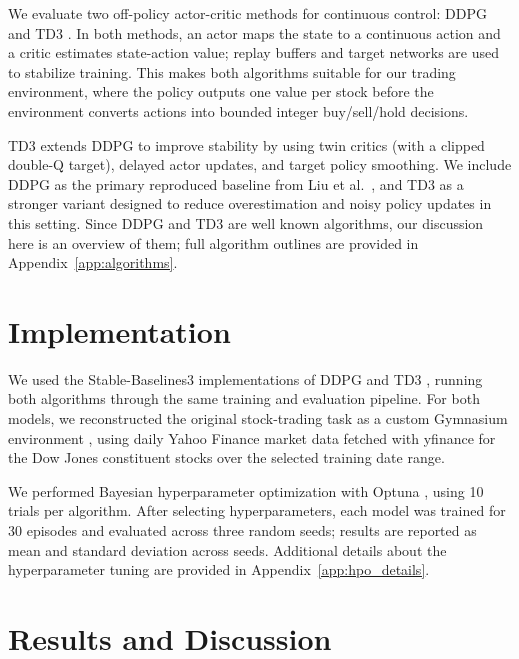 \documentclass{article}
\begin{document}
We evaluate two off-policy actor-critic methods for continuous control: DDPG \cite{lillicrap2015} and TD3 \cite{fujimoto2018}. In both methods, an actor maps the state to a continuous action and a critic estimates state-action value; replay buffers and target networks are used to stabilize training. This makes both algorithms suitable for our trading environment, where the policy outputs one value per stock before the environment converts actions into bounded integer buy/sell/hold decisions.

TD3 extends DDPG to improve stability by using twin critics (with a clipped double-Q target), delayed actor updates, and target policy smoothing. We include DDPG as the primary reproduced baseline from Liu et al.\ \cite{liu2018practical}, and TD3 as a stronger variant designed to reduce overestimation and noisy policy updates in this setting. Since DDPG and TD3 are well known algorithms, our discussion here is an overview of them; full algorithm outlines are provided in Appendix~\ref{app:algorithms}.

\section{Implementation}

We used the Stable-Baselines3 implementations of DDPG and TD3 \citep{stable-baselines3}, running both algorithms through the same training and evaluation pipeline. For both models, we reconstructed the original stock-trading task as a custom Gymnasium environment \citep{gymnasium}, using daily Yahoo Finance market data fetched with yfinance \citep{yfinance} for the Dow Jones constituent stocks over the selected training date range.

We performed Bayesian hyperparameter optimization with Optuna \citep{akiba2019optuna}, using 10 trials per algorithm. After selecting hyperparameters, each model was trained for 30 episodes and evaluated across three random seeds; results are reported as mean and standard deviation across seeds. Additional details about the hyperparameter tuning are provided in Appendix~\ref{app:hpo_details}.



\section{Results and Discussion}
\end{document}
